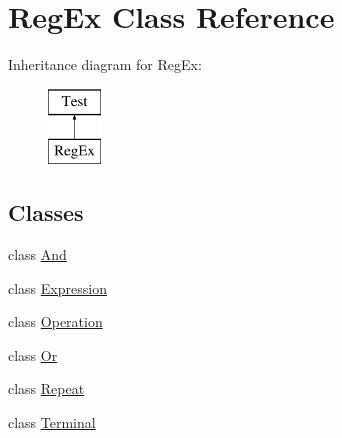 \hypertarget{class_reg_ex}{}\section{Reg\+Ex Class Reference}
\label{class_reg_ex}
Inheritance diagram for Reg\+Ex\+:\begin{figure}[H]
\begin{center}
\leavevmode
\includegraphics[height=2.000000cm]{class_reg_ex}
\end{center}
\end{figure}
\subsection*{Classes}
\begin{DoxyCompactItemize}
\item 
class \hyperlink{class_reg_ex_1_1_and}{And}
\item 
class \hyperlink{class_reg_ex_1_1_expression}{Expression}
\item 
class \hyperlink{class_reg_ex_1_1_operation}{Operation}
\item 
class \hyperlink{class_reg_ex_1_1_or}{Or}
\item 
class \hyperlink{class_reg_ex_1_1_repeat}{Repeat}
\item 
class \hyperlink{class_reg_ex_1_1_terminal}{Terminal}
\end{DoxyCompactItemize}
